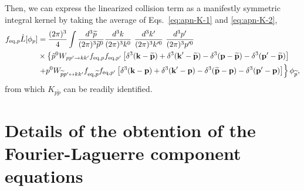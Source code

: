 \documentclass[aps,prd,preprint,nofootinbib,amsmath,amssymb,showpacs,longbibliography,singlecolumn,superscriptaddress,10pt]{revtex4-1}
\theoremstyle{plain}
\theoremstyle{definition}
\begin{document}
%
Then, we can express the linearized collision term as a manifestly symmetric integral kernel by taking the average of Eqs.~\eqref{eq:apn-K-1} and \eqref{eq:apn-K-2}, 
%
\begin{equation}
\begin{aligned}
f_{\mathrm{eq},p}
\Hat{L}[\phi_{p}] 
&
=
\frac{(2\pi)^3}{4} \int 
\frac{d^3\widetilde{p}}{(2\pi)^3 \widetilde{p}^0} \frac{d^3k}{(2\pi)^3 k^0}  \ \frac{d^{3}k'}{(2 \pi)^{3} k'^{0}} \ \frac{d^{3}p'}{(2 \pi)^{3} p'^{0}} \,  
\\
&
\times
\left\{ 
\tilde{p}^0   W_{pp' \rightarrow kk'} f_{\mathrm{eq},p} f_{\mathrm{eq},p'}
\left[ \delta^{3}(\textbf{k}-\widetilde{\textbf{p}}) + \delta^{3}(\textbf{k}'-\widetilde{\textbf{p}}) 
- \delta^{3}(\textbf{p}-\widetilde{\textbf{p}}) - \delta^{3}(\textbf{p}'-\widetilde{\textbf{p}}) \right]
\right.
\\
&
\left.
+
p^{0} W_{\widetilde{p}p' \leftrightarrow kk'} f_{\mathrm{eq},\widetilde{p}} f_{\mathrm{eq},p'}  
\left[\delta^{3}(\textbf{k} - \textbf{p} ) 
+ 
 \delta^{3}(\textbf{k}' - \textbf{p}) 
- 
\delta^{3}(\widetilde{\textbf{p}} - \textbf{p}) 
- 
\delta^{3}(\textbf{p}' - \textbf{p})  \right]
\right\}
\phi_{\widetilde{p}},
\end{aligned}    
\end{equation}
%
from which $K_{p \widetilde{p}}$ can be readily identified.

\section{Details of the obtention of the Fourier-Laguerre component equations}
\label{sec:F-moms}
\end{document}
